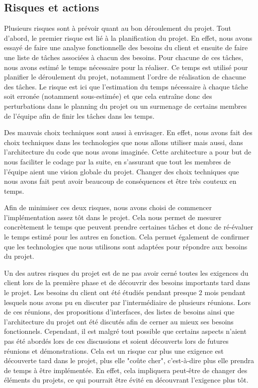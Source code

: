 \documentclass{article}
\begin{document}
\subsection{Risques et actions}\label{sec:risques}

Plusieurs risques sont à prévoir quant au bon déroulement du projet. Tout d'abord, le premier risque est lié
à la planification du projet. En effet, nous avons essayé de faire une analyse fonctionnelle des besoins du client et ensuite
de faire une liste de tâches associées à chacun des besoins. Pour chacune de ces tâches, nous avons estimé le temps nécessaire pour la réaliser.
Ce temps est utilisé pour planifier le déroulement du projet, notamment l'ordre de réalisation de chacune des tâches.
Le risque est ici que l'estimation du temps nécessaire à chaque tâche soit erronée (notamment sous-estimée) et que cela entraîne donc des perturbations
dans le planning du projet ou un surmenage de certains membres de l'équipe afin de finir les tâches dans les temps.

Des mauvais choix techniques sont aussi à envisager. En effet, nous avons fait des choix techniques dans les technologies que nous allons utiliser
mais aussi, dans l'architecture du code que nous avons imaginée. Cette architecture a pour but de nous faciliter le codage par la suite, en s'assurant 
que tout les membres de l'équipe aient une vision globale du projet. Changer des choix techniques que nous avons fait peut avoir beaucoup de conséquences
et être très couteux en temps.

Afin de minimiser ces deux risques, nous avons choisi de commencer l'implémentation assez tôt dans le projet. Cela nous permet de mesurer concrètement le temps que peuvent
prendre certaines tâches et donc de ré-évaluer le temps estimé pour les autres en fonction. Cela permet également de confirmer que les technologies que nous utilisons sont adaptées 
pour répondre aux besoins du projet.

Un des autres risques du projet est de ne pas avoir cerné toutes les exigences du client lors de la première phase et 
de découvrir des besoins importants tard dans le projet. Les besoins du client ont été étudiés pendant presque 2 mois
pendant lesquels nous avons pu en discuter par l'intermédiaire de plusieurs réunions. Lors de ces réunions, des propositions
d'interfaces, des listes de besoins ainsi que l'architecture du projet ont été discutés afin de cerner au mieux ses besoins fonctionnels.
Cependant, il est malgré tout possible que certains aspects n'aient pas été abordés lors de ces discussions et soient découverts 
lors de futures réunions et démonstrations. Cela est un risque car plus une exigence est découverte tard dans le projet,
plus elle "coûte cher", c'est-à-dire plus elle prendra de temps à être implémentée. En effet, cela impliquera peut-être de changer
des éléments du projets, ce qui pourrait être évité en découvrant l'exigence plus tôt.
\end{document}
